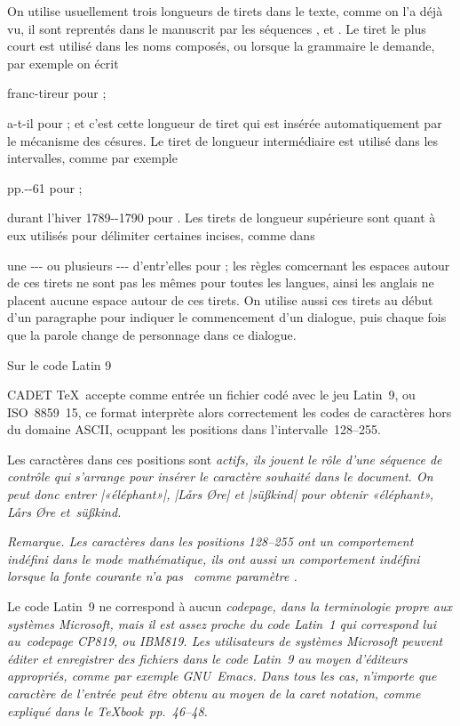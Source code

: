 On utilise usuellement trois longueurs de tirets dans le texte, comme
on l'a déjà vu, il sont reprentés dans le manuscrit par les séquences
\li{-}, \li{-{}-} et \li{-{-}-}. Le tiret le plus court est utilisé
dans les noms composés, ou lorsque la grammaire le demande, par
exemple on écrit
\beginlist\inset\literal
\item{franc-tireur} pour ;
\item{a-t-il} pour ;
\endlist
et c'est cette longueur de tiret qui est insérée automatiquement par
le mécanisme des césures. Le tiret de longueur intermédiaire est
utilisé dans les intervalles, comme par exemple
\beginlist\inset\literal
\item{pp.-{}-61}
 pour ;
\item{durant l'hiver 1789-{}-1790}
 pour .
\endlist
Les tirets de longueur supérieure sont quant à eux utilisés pour
délimiter certaines incises, comme dans
\beginlist\inset\literal
\item{une -{-}- ou plusieurs -{-}- d'entr'elles}
 pour ;
\endlist
les règles comcernant les espaces autour de ces tirets ne sont pas les
mêmes pour toutes les langues, ainsi les anglais ne placent aucune
espace autour de ces tirets. On utilise aussi ces tirets au début d'un
paragraphe pour indiquer le commencement d'un dialogue, puis chaque
fois que la parole change de personnage dans ce dialogue.


\formalpar Sur le code Latin 9

CADET \TeX\ accepte comme entrée un fichier codé avec le jeu Latin~9,
ou ISO~8859~15, ce format interprète alors correctement les codes de
caractères hors du domaine ASCII, ocuppant les positions dans
l'intervalle~128--255.

Les caractères dans ces positions sont \em{actifs}, ils jouent le rôle
d'une séquence de contrôle qui s'arrange pour insérer le caractère
souhaité dans le document. On peut donc entrer |«éléphant»|,
|Lårs Øre| et |süßkind| pour obtenir \em{«éléphant»}, \em{Lårs Øre}
et~\em{süßkind}.

\em{Remarque. Les caractères dans les positions 128--255 ont un
comportement indéfini dans le mode mathématique, ils ont aussi
un comportement indéfini lorsque la fonte courante n'a pas~
comme paramètre .}

Le code Latin~9 ne correspond à aucun \em{codepage}, dans la
terminologie propre aux systèmes Microsoft, mais il est assez proche
du code Latin~1 qui correspond lui au~\em{codepage} CP819, ou
IBM819. Les utilisateurs de systèmes Microsoft peuvent éditer et
enregistrer des fichiers dans le code Latin~9 au moyen d'éditeurs
appropriés, comme par exemple GNU~Emacs. Dans tous les cas, n'importe
que caractère de l'entrée peut être obtenu au moyen de la \em{caret
notation}, comme expliqué dans le {\sl\TeX book}~pp.~46--48.

